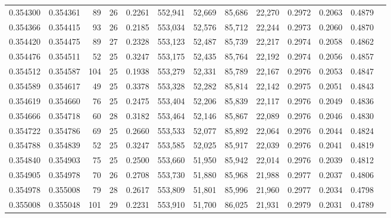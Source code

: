 \begin{tabular}{rrrrrrrrrrrrr}
0.354300 & 0.354361 &    89 &  26 &                                     0.2261 & 552,941 &  52,669 &  85,686 &  22,270 & 0.2972 & 0.2063 & 0.4879 \\
0.354366 & 0.354415 &    93 &  26 &                                     0.2185 & 553,034 &  52,576 &  85,712 &  22,244 & 0.2973 & 0.2060 & 0.4870 \\
0.354420 & 0.354475 &    89 &  27 &                                     0.2328 & 553,123 &  52,487 &  85,739 &  22,217 & 0.2974 & 0.2058 & 0.4862 \\
0.354476 & 0.354511 &    52 &  25 &                                     0.3247 & 553,175 &  52,435 &  85,764 &  22,192 & 0.2974 & 0.2056 & 0.4857 \\
0.354512 & 0.354587 &   104 &  25 &                                     0.1938 & 553,279 &  52,331 &  85,789 &  22,167 & 0.2976 & 0.2053 & 0.4847 \\
0.354589 & 0.354617 &    49 &  25 &                                     0.3378 & 553,328 &  52,282 &  85,814 &  22,142 & 0.2975 & 0.2051 & 0.4843 \\
0.354619 & 0.354660 &    76 &  25 &                                     0.2475 & 553,404 &  52,206 &  85,839 &  22,117 & 0.2976 & 0.2049 & 0.4836 \\
0.354666 & 0.354718 &    60 &  28 &                                     0.3182 & 553,464 &  52,146 &  85,867 &  22,089 & 0.2976 & 0.2046 & 0.4830 \\
0.354722 & 0.354786 &    69 &  25 &                                     0.2660 & 553,533 &  52,077 &  85,892 &  22,064 & 0.2976 & 0.2044 & 0.4824 \\
0.354788 & 0.354839 &    52 &  25 &                                     0.3247 & 553,585 &  52,025 &  85,917 &  22,039 & 0.2976 & 0.2041 & 0.4819 \\
0.354840 & 0.354903 &    75 &  25 &                                     0.2500 & 553,660 &  51,950 &  85,942 &  22,014 & 0.2976 & 0.2039 & 0.4812 \\
0.354905 & 0.354978 &    70 &  26 &                                     0.2708 & 553,730 &  51,880 &  85,968 &  21,988 & 0.2977 & 0.2037 & 0.4806 \\
0.354978 & 0.355008 &    79 &  28 &                                     0.2617 & 553,809 &  51,801 &  85,996 &  21,960 & 0.2977 & 0.2034 & 0.4798 \\
0.355008 & 0.355048 &   101 &  29 &                                     0.2231 & 553,910 &  51,700 &  86,025 &  21,931 & 0.2979 & 0.2031 & 0.4789 \\

\end{tabular}
